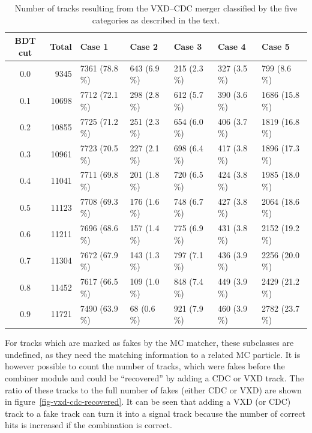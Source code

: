 \begin{table}
  \centering
  \caption{Number of tracks resulting from the VXD--CDC merger classified by the five categories as described in the text.}
  \begin{tabular}{crlllll}
    \toprule
    BDT cut &  Total &         Case 1 &       Case 2 &       Case 3 &       Case 4 &         Case 5 \\
    \midrule
	0.0 &   9345 &  7361 (78.8 \%) &  643 (6.9 \%) &  215 (2.3 \%) &  327 (3.5 \%) &    799 (8.6 \%) \\
	0.1 &  10698 &  7712 (72.1 \%) &  298 (2.8 \%) &  612 (5.7 \%) &  390 (3.6 \%) &  1686 (15.8 \%) \\
	0.2 &  10855 &  7725 (71.2 \%) &  251 (2.3 \%) &  654 (6.0 \%) &  406 (3.7 \%) &  1819 (16.8 \%) \\
	0.3 &  10961 &  7723 (70.5 \%) &  227 (2.1 \%) &  698 (6.4 \%) &  417 (3.8 \%) &  1896 (17.3 \%) \\
	0.4 &  11041 &  7711 (69.8 \%) &  201 (1.8 \%) &  720 (6.5 \%) &  424 (3.8 \%) &  1985 (18.0 \%) \\
	0.5 &  11123 &  7708 (69.3 \%) &  176 (1.6 \%) &  748 (6.7 \%) &  427 (3.8 \%) &  2064 (18.6 \%) \\
	0.6 &  11211 &  7696 (68.6 \%) &  157 (1.4 \%) &  775 (6.9 \%) &  431 (3.8 \%) &  2152 (19.2 \%) \\
	0.7 &  11304 &  7672 (67.9 \%) &  143 (1.3 \%) &  797 (7.1 \%) &  436 (3.9 \%) &  2256 (20.0 \%) \\
	0.8 &  11452 &  7617 (66.5 \%) &  109 (1.0 \%) &  848 (7.4 \%) &  449 (3.9 \%) &  2429 (21.2 \%) \\
	0.9 &  11721 &  7490 (63.9 \%) &   68 (0.6 \%) &  921 (7.9 \%) &  460 (3.9 \%) &  2782 (23.7 \%) \\
    \bottomrule
  \end{tabular}
  \label{tab-vxd-cdc-cases}
\end{table}

For tracks which are marked as fakes by the MC matcher, these subclasses are undefined, as they need the matching information to a related MC particle. It is however possible to count the number of tracks, which were fakes before the combiner module and could be ``recovered'' by adding a CDC or VXD track. The ratio of these tracks to the full number of fakes (either CDC or VXD) are shown in figure~\ref{fig-vxd-cdc-recovered}. It can be seen that adding a VXD (or CDC) track to a fake track can turn it into a signal track because the number of correct hits is increased if the combination is correct. 

